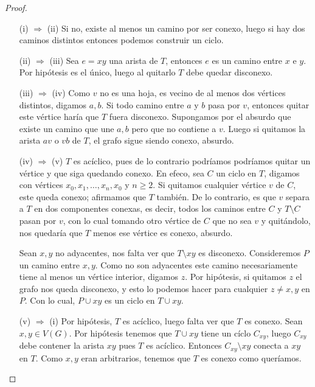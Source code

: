 \documentclass[12pt]{report}
\theoremstyle{plain}
\theoremstyle{definition}
\begin{document}
\begin{proof}
\begin{enumerate}[leftmargin=2cm]
\item[]

\item[(i) $\Rightarrow$ (ii)] Si no, existe al menos un camino por ser conexo, luego si hay dos caminos distintos entonces podemos construir un ciclo.

\item[(ii) $\Rightarrow$ (iii)] Sea $e = xy$ una arista de $T$, entonces $e$ es un camino entre $x$ e $y$. Por hipótesis es el único, luego al quitarlo $T$ debe quedar disconexo.

\item[(iii) $\Rightarrow$ (iv)] Como $v$ no es una hoja, es vecino de al menos dos vértices distintos, digamos $a,b$. Si todo camino entre $a$ y $b$ pasa por $v$, entonces quitar este vértice haría que $T$ fuera disconexo. Supongamos por el absurdo que existe un camino que une $a,b$ pero que no contiene a $v$. Luego si quitamos la arista $av$ o $vb$ de $T$, el grafo sigue siendo conexo, absurdo.

\item[(iv) $\Rightarrow$ (v)] $T$ es acíclico, pues de lo contrario podríamos podríamos quitar un vértice y que siga quedando conexo. En efeco, sea $C$ un ciclo en $T$, digamos con vértices $x_0,x_1,\ldots,x_n,x_0$ y $n \geq 2$. Si quitamos cualquier vértice $v$ de $C$, este queda conexo; afirmamos que $T$ también. De lo contrario, es que $v$ separa a $T$ en dos componentes conexas, es decir, todos los caminos entre $C$ y $T \setminus C$ pasan por $v$, con lo cual tomando otro vértice de $C$ que no sea $v$ y quitándolo, nos quedaría que $T$ menos ese vértice es conexo, absurdo.

Sean $x,y$ no adyacentes, nos falta ver que $T \setminus xy$ es disconexo. Consideremos $P$ un camino entre $x,y$. Como no son adyacentes este camino necesariamente tiene al menos un vértice interior, digamos $z$. Por hipótesis, si quitamos $z$ el grafo nos queda disconexo, y esto lo podemos hacer para cualquier $z \neq x,y$ en $P$. Con lo cual, $P \cup xy$ es un ciclo en $T \cup xy$.

\item[(v) $\Rightarrow$ (i)] Por hipótesis, $T$ es acíclico, luego falta ver que $T$ es conexo. Sean $x,y \in V(G)$. Por hipótesis tenemos que $T \cup xy$ tiene un cíclo $C_{xy}$, luego $C_{xy}$ debe contener la arista $xy$ pues $T$ es acíclico. Entonces $C_{xy} \setminus xy$ conecta a $xy$ en $T$. Como $x,y$ eran arbitrarios, tenemos que $T$ es conexo como queríamos.
\end{enumerate}
\end{proof}
\end{document}
